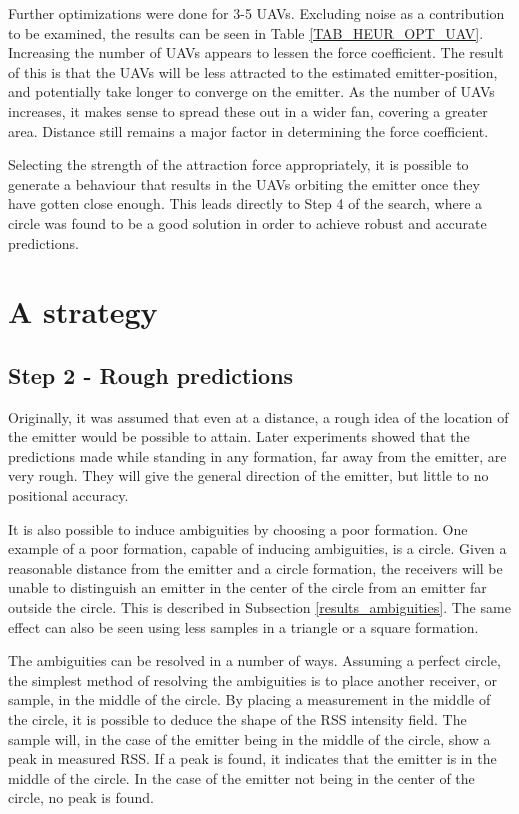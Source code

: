 \documentclass[10pt,a4paper]{book}
\begin{document}
Further optimizations were done for 3-5 \glspl{UAV}. Excluding noise as a contribution to be examined, the results can be seen in Table \ref{TAB_HEUR_OPT_UAV}. Increasing the number of \glspl{UAV} appears to lessen the force coefficient. The result of this is that the \glspl{UAV} will be less attracted to the estimated emitter-position, and potentially take longer to converge on the emitter. As the number of \glspl{UAV} increases, it makes sense to spread these out in a wider fan, covering a greater area. Distance still remains a major factor in determining the force coefficient. 

Selecting the strength of the attraction force appropriately, it is possible to generate a behaviour that results in the \glspl{UAV} orbiting the emitter once they have gotten close enough. This leads directly to Step 4 of the search, where a circle was found to be a good solution in order to achieve robust and accurate predictions.





\newpage

\section{A strategy}

\subsection{Step 2 - Rough predictions}

Originally, it was assumed that even at a distance, a rough idea of the location of the emitter would be possible to attain. Later experiments showed that the predictions made while standing in any formation, far away from the emitter, are very rough. They will give the general direction of the emitter, but little to no positional accuracy. 

It is also possible to induce ambiguities by choosing a poor formation. One example of a poor formation, capable of inducing ambiguities, is a circle. Given a reasonable distance from the emitter and a circle formation, the receivers will be unable to distinguish an emitter in the center of the circle from an emitter far outside the circle. This is described in Subsection \ref{results_ambiguities}. The same effect can also be seen using less samples in a triangle or a square formation.

The ambiguities can be resolved in a number of ways. Assuming a perfect circle, the simplest method of resolving the ambiguities is to place another receiver, or sample, in the middle of the circle. By placing a measurement in the middle of the circle, it is possible to deduce the shape of the \gls{RSS} intensity field. The sample will, in the case of the emitter being in the middle of the circle, show a peak in measured \gls{RSS}. If a peak is found, it indicates that the emitter is in the middle of the circle. In the case of the emitter not being in the center of the circle, no peak is found.
\end{document}
